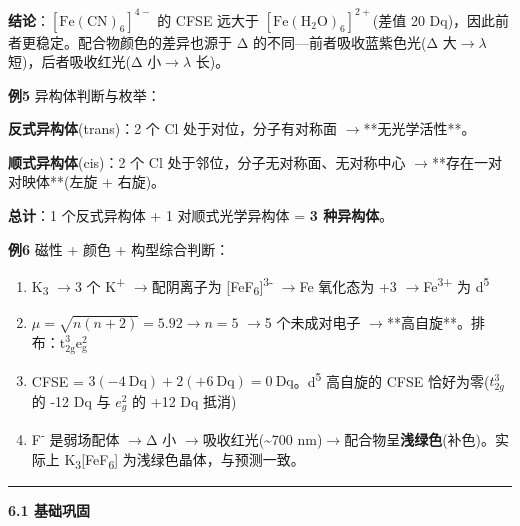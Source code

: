 \documentclass[a4paper,11pt]{ctexart}
\newcommand{\箭}{\ensuremath{\rightarrow}}
\newcommand{\左箭}{\ensuremath{\leftarrow}}
\newcommand{\上箭}{\ensuremath{\uparrow}}
\newcommand{\下箭}{\ensuremath{\downarrow}}
\newcommand{\衡}{\ensuremath{\rightleftharpoons}}
\newcommand{\双箭}{\ensuremath{\leftrightarrow}}
\newcommand{\约等于}{\ensuremath{\approx}}
\newcommand{\小于等于}{\ensuremath{\leq}}
\newcommand{\大于等于}{\ensuremath{\geq}}
\newcommand{\不等于}{\ensuremath{\neq}}
\newcommand{\西格马}{\ensuremath{\sigma}}
\newcommand{\派}{\ensuremath{\pi}}
\begin{document}
\textbf{结论}：\([\mathrm{Fe(CN)_6}]^{4-}\) 的 CFSE 远大于 \([\mathrm{Fe(H_2O)_6}]^{2+}\)(差值 20 Dq)，因此前者更稳定。配合物颜色的差异也源于 Δ 的不同---前者吸收蓝紫色光(Δ 大\箭\(\lambda\) 短)，后者吸收红光(Δ 小\箭\(\lambda\) 长)。

\textbf{例5} 异构体判断与枚举：

\textbf{反式异构体}(trans)：2 个 Cl 处于对位，分子有对称面 \箭 **无光学活性**。

\textbf{顺式异构体}(cis)：2 个 Cl 处于邻位，分子无对称面、无对称中心 \箭 **存在一对对映体**(左旋 + 右旋)。

\textbf{总计}：1 个反式异构体 + 1 对顺式光学异构体 = \textbf{3 种异构体}。

\textbf{例6} 磁性 + 颜色 + 构型综合判断：

\begin{enumerate}
\def\labelenumi{(\arabic{enumi})}
\item
  K\textsubscript{3} \箭 3 个 K\textsuperscript{+} \箭 配阴离子为 {[}FeF\textsubscript{6}{]}\textsuperscript{3-} \箭 Fe 氧化态为 +3 \箭 Fe\textsuperscript{3+} 为 d\textsuperscript{5}
\item
  \(\mu = \sqrt{n(n+2)} = 5.92 \rightarrow n = 5\) \箭 5 个未成对电子 \箭 **高自旋**。排布：\(\mathrm{t_{2g}^3 e_g^2}\)
\item
  CFSE = \(3(-4\ \mathrm{Dq}) + 2(+6\ \mathrm{Dq}) = 0\ \mathrm{Dq}\)。d\textsuperscript{5} 高自旋的 CFSE 恰好为零(\(t_{2g}^3\) 的 -12 Dq 与 \(e_g^2\) 的 +12 Dq 抵消)
\item
  F\textsuperscript{-} 是弱场配体 \箭 Δ 小 \箭 吸收红光(\textasciitilde700 nm)\箭 配合物呈\textbf{浅绿色}(补色)。实际上 K\textsubscript{3}{[}FeF\textsubscript{6}{]} 为浅绿色晶体，与预测一致。
\end{enumerate}

\begin{center}\rule{0.5\linewidth}{0.5pt}\end{center}

\textbf{6.1 基础巩固}
\end{document}
